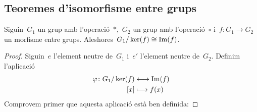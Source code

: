 \documentclass[../../main.tex]{subfiles}
\begin{document}
    \subsection{Teoremes d'isomorfisme entre grups}
    \begin{theorem}
        \label{thm:Teorema fonamental dels isomorfismes}%
            Siguin~\(G_{1}\) un grup amb l'operació~\(\ast\),~\(G_{2}\) un grup amb l'operació~\(\circ\) i~\(f\colon G_{1}\to G_{2}\) un morfisme entre grups.
            Aleshores~\(G_{1}/\operatorname{ker}(f)\cong\operatorname{Im}(f)\).
    \end{theorem}
    \begin{proof}
        Siguin~\(e\) l'element neutre de~\(G_{1}\) i~\(e'\) l'element neutre de~\(G_{2}\).
        Definim l'aplicació
        \begin{align}
        \label{thm:Teorema fonamental dels isomorfismes:eq1}
        \varphi\colon G_{1}/\operatorname{ker}(f)&\longleftrightarrow\operatorname{Im}(f)\\
        [x]&\longmapsto f(x)\nonumber
        \end{align}
        Comprovem primer que aquesta aplicació està ben definida:


\end{proof}
\end{document}
